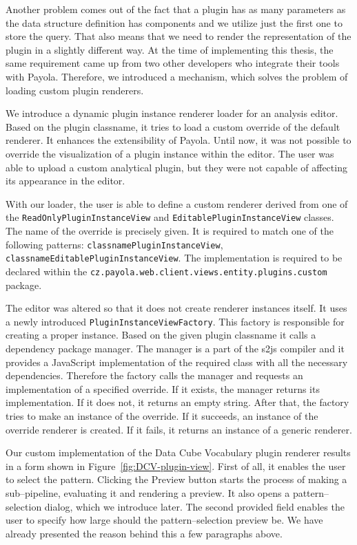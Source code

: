Another problem comes out of the fact that a plugin has as many parameters as 
the data structure definition has components and we utilize just the first one 
to store the query. That also means that we need to render the representation 
of the plugin in a slightly different way. At the time of implementing this 
thesis, the same requirement came up from two other developers who integrate their 
tools with Payola. Therefore, we introduced a mechanism, which solves the 
problem of loading custom plugin renderers.

We introduce a dynamic plugin instance renderer loader for an analysis editor. 
Based on the plugin classname, it tries to load a custom override of the default 
renderer. It enhances the extensibility of Payola. Until now, it was not 
possible to override the visualization of a plugin instance within the editor. The 
user was able to upload a custom analytical plugin, but they were not capable of affecting its
appearance in the editor.

\begin{sloppypar}
With our loader, the user is able to define a custom renderer derived from 
one of the \texttt{ReadOnlyPluginInstanceView} and \texttt{EditablePluginInstanceView} 
classes. The name of the override is precisely given. It is required to match one 
of the following patterns: \texttt{{classname}PluginInstanceView},
\texttt{{classname}EditablePluginInstanceView}. The implementation is required to
be declared within the \texttt{cz.payola.web.client.views.entity.plugins.custom} package.
\end{sloppypar}

The editor was altered so that it does not create renderer instances itself. It 
uses a newly introduced \texttt{PluginInstance\allowbreak ViewFactory}. This 
factory is responsible for creating a proper instance. Based on the given plugin 
classname it calls a dependency package manager. The manager is a part of the 
s2js compiler and it provides a JavaScript implementation of the required class
with all the necessary dependencies. Therefore the factory calls the manager and 
requests an implementation of a specified override. If it exists, the manager 
returns its implementation. If it does not, it returns an empty string. After 
that, the factory tries to make an instance of the override. If it succeeds, an 
instance of the override renderer is created. If it fails, it returns an 
instance of a generic renderer. 
 
Our custom implementation of the Data Cube Vocabulary plugin renderer results 
in a form shown in Figure~\ref{fig:DCV-plugin-view}. First of all, it 
enables the user to select the pattern. Clicking the Preview button starts the process of making a
sub--pipeline, evaluating it and rendering a preview. It also opens a pattern--selection
dialog, which we introduce later. The second provided field enables the user to specify how large should 
the pattern--selection preview be. We have already presented the reason behind this 
a few paragraphs above.

